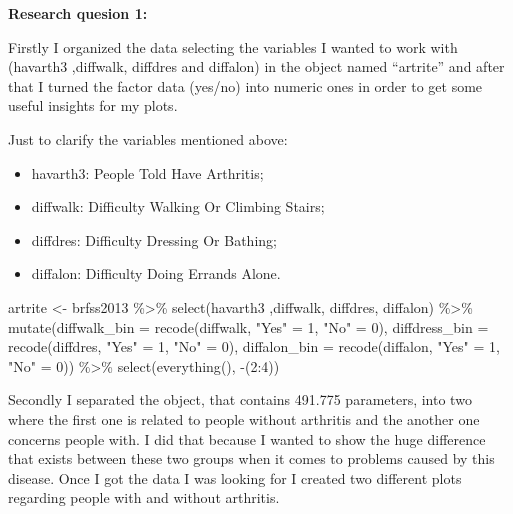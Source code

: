 \documentclass[
]{article}
\newenvironment{Shaded}{\begin{snugshade}}{\end{snugshade}}
\newcommand{\AttributeTok}[1]{\textcolor[rgb]{0.77,0.63,0.00}{#1}}
\newcommand{\DecValTok}[1]{\textcolor[rgb]{0.00,0.00,0.81}{#1}}
\newcommand{\FunctionTok}[1]{\textcolor[rgb]{0.00,0.00,0.00}{#1}}
\newcommand{\NormalTok}[1]{#1}
\newcommand{\OtherTok}[1]{\textcolor[rgb]{0.56,0.35,0.01}{#1}}
\newcommand{\SpecialCharTok}[1]{\textcolor[rgb]{0.00,0.00,0.00}{#1}}
\newcommand{\StringTok}[1]{\textcolor[rgb]{0.31,0.60,0.02}{#1}}
\providecommand{\tightlist}{%
  \setlength{\itemsep}{0pt}\setlength{\parskip}{0pt}}
\begin{document}
\textbf{Research quesion 1:}

Firstly I organized the data selecting the variables I wanted to work
with (havarth3 ,diffwalk, diffdres and diffalon) in the object named
``artrite'' and after that I turned the factor data (yes/no) into
numeric ones in order to get some useful insights for my plots.

Just to clarify the variables mentioned above:

\begin{itemize}
\tightlist
\item
  havarth3: People Told Have Arthritis;
\item
  diffwalk: Difficulty Walking Or Climbing Stairs;
\item
  diffdres: Difficulty Dressing Or Bathing;
\item
  diffalon: Difficulty Doing Errands Alone.
\end{itemize}

\begin{Shaded}
\begin{Highlighting}[]
\NormalTok{artrite }\OtherTok{\textless{}{-}}\NormalTok{ brfss2013 }\SpecialCharTok{\%\textgreater{}\%} 
   \FunctionTok{select}\NormalTok{(havarth3 ,diffwalk, diffdres, diffalon) }\SpecialCharTok{\%\textgreater{}\%} 
  \FunctionTok{mutate}\NormalTok{(}\AttributeTok{diffwalk\_bin =} \FunctionTok{recode}\NormalTok{(diffwalk,}
                            \StringTok{"Yes"} \OtherTok{=} \DecValTok{1}\NormalTok{,}
                            \StringTok{"No"} \OtherTok{=} \DecValTok{0}\NormalTok{),}
         \AttributeTok{diffdress\_bin =} \FunctionTok{recode}\NormalTok{(diffdres,}
                            \StringTok{"Yes"} \OtherTok{=} \DecValTok{1}\NormalTok{,}
                            \StringTok{"No"} \OtherTok{=} \DecValTok{0}\NormalTok{),}
         \AttributeTok{diffalon\_bin =} \FunctionTok{recode}\NormalTok{(diffalon,}
                            \StringTok{"Yes"} \OtherTok{=} \DecValTok{1}\NormalTok{,}
                            \StringTok{"No"} \OtherTok{=} \DecValTok{0}\NormalTok{)) }\SpecialCharTok{\%\textgreater{}\%} 
  \FunctionTok{select}\NormalTok{(}\FunctionTok{everything}\NormalTok{(), }\SpecialCharTok{{-}}\NormalTok{(}\DecValTok{2}\SpecialCharTok{:}\DecValTok{4}\NormalTok{))}
\end{Highlighting}
\end{Shaded}

Secondly I separated the object, that contains 491.775 parameters, into
two where the first one is related to people without arthritis and the
another one concerns people with. I did that because I wanted to show
the huge difference that exists between these two groups when it comes
to problems caused by this disease. Once I got the data I was looking
for I created two different plots regarding people with and without
arthritis.
\end{document}
